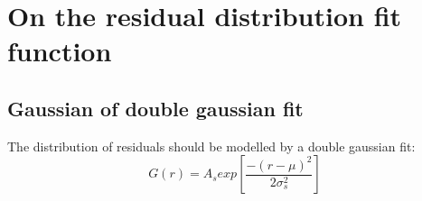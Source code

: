 \chapter[Residual distribution fit function]{On the residual distribution fit function}
\label{appendix-double_gaussian}

\section{Gaussian of double gaussian fit}

The distribution of residuals should be modelled by a double gaussian fit:
$$ G(r) = A_{s}exp\left[ \frac{-(r-\mu)^{2}}{2\sigma_s^{2}} \right] $$